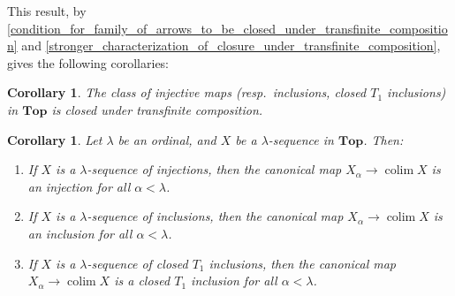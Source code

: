 \documentclass{amsart}
\theoremstyle{plain}
\newtheorem{corollary}[theorem]{Corollary}
\theoremstyle{definition}
\newcommand{\Top}{\mbf{Top}}
\newcommand{\0}{\mathbf{0}}
\newcommand{\mbf}[1]{\mathbf{#1}}
\renewcommand{\(}{\left(}
\renewcommand{\)}{\right)}
\DeclareMathOperator*{\colim}{colim}
\begin{document}
This result, by \autoref{condition_for_family_of_arrows_to_be_closed_under_transfinite_composition} and \autoref{stronger_characterization_of_closure_under_transfinite_composition}, gives the following corollaries:

\begin{corollary}
  The class of injective maps (resp.\ inclusions, closed $T_1$ inclusions) in $\Top$ is closed under transfinite composition.
\end{corollary}

\begin{corollary}\label{inclusions_closed_under_transfinite_composition}
  Let $\lambda$ be an ordinal, and $X$ be a $\lambda$-sequence in $\Top$. 
  Then:
  \begin{enumerate}[label=(\roman*),noitemsep]
    \item If $X$ is a $\lambda$-sequence of injections, then the canonical map $X_\alpha\to\colim X$ is an injection for all $\alpha<\lambda$.
    \item If $X$ is a $\lambda$-sequence of inclusions, then the canonical map $X_\alpha\to\colim X$ is an inclusion for all $\alpha<\lambda$.
    \item If $X$ is a $\lambda$-sequence of closed $T_1$ inclusions, then the canonical map $X_\alpha\to\colim X$ is a closed $T_1$ inclusion for all $\alpha<\lambda$.
  \end{enumerate} 
\end{corollary}
\end{document}
